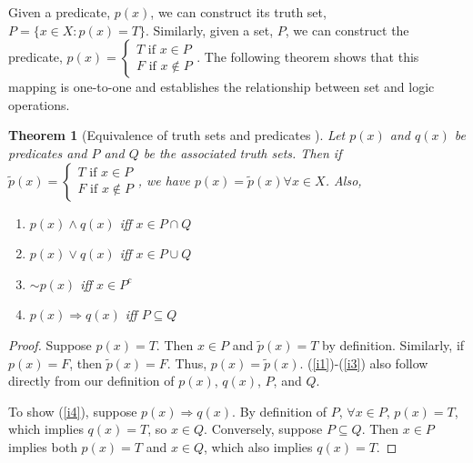 \documentclass[12pt,reqno]{amsart}
\newtheorem{theorem}{Theorem}[section]
\theoremstyle{definition}
\begin{document}
Given a predicate, $p(x)$, we can construct its truth set, $P = \{x
\in X: p(x) = T\}$. Similarly, given a set, $P$, we can construct the
predicate,
$p(x) = \begin{cases} T \text{ if } x \in P \\
  F \text{ if } x \not\in P \end{cases}$. The following theorem shows
that this mapping is one-to-one and establishes the relationship
between set and logic operations.
\begin{theorem}[Equivalence of truth sets and
  predicates \label{thm:setLogic}] Let $p(x)$
  and $q(x)$ be predicates and $P$ and $Q$ be
  the associated truth sets. Then if $\tilde{p}(x) = \begin{cases} T
    \text{ if } x \in P \\ 
    F \text{ if } x \not\in P \end{cases}$, we have $p(x) = \tilde{p}(x)
  \forall x \in X$. Also, 
  \begin{enumerate}
  \item\label{i1} $p(x) \wedge q(x)$ iff $x \in P \cap Q$
  \item\label{i2} $p(x) \vee q(x)$ iff $x \in P \cup Q$
  \item\label{i3} $\sim p(x)$ iff $x \in P^c$
  \item\label{i4} $p(x) \Rightarrow q(x)$ iff $P \subseteq Q$
  \end{enumerate}
\end{theorem}
\begin{proof}
  Suppose $p(x) = T$. Then $x \in P$ and $\tilde{p}(x) = T$ by
  definition. Similarly, if $p(x) = F$, then $\tilde{p}(x) = F$. Thus,
  $p(x) = \tilde{p}(x)$.  (\ref{i1})-(\ref{i3}) also follow directly
  from our definition of $p(x)$, $q(x)$, $P$, and $Q$.

  To show (\ref{i4}), suppose $p(x) \Rightarrow q(x)$. By definition
  of $P$, $\forall x \in P$, $p(x) = T$, which implies $q(x) = T$, so
  $x \in Q$. Conversely, suppose $P \subseteq Q$. Then $x \in P$
  implies both $p(x) = T$ and $x \in Q$, which also implies $q(x) =
  T$. 
\end{proof}
\end{document}
